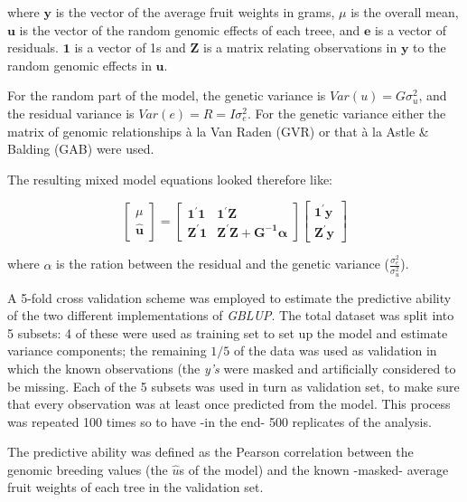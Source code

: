 \documentclass[english,11pt,a4paper]{scrartcl}
\begin{document}
where $\boldsymbol{y}$ is the vector of the average fruit weights in
grams, $\mu$ is the overall mean, $\boldsymbol{u}$ is the
vector of the random genomic effects of each treee, and $\boldsymbol{e}$ is a
vector of residuals. $\boldsymbol{1}$ is a vector of 1s and
$\boldsymbol{Z}$ is a matrix relating observations in $\boldsymbol{y}$ to
the random genomic effects in $\boldsymbol{u}$.

For the random part of the model, the genetic variance is
$Var(u)=G\sigma^2_u$, and the residual variance is
$Var(e)=R=I\sigma^2_e$.
For the genetic variance either the matrix of genomic relationships
\`{a} la Van Raden (GVR) or that \`{a} la Astle \& Balding (GAB) were used. 

The resulting mixed model equations looked therefore like:

\begin{equation}
\begin{bmatrix}
\mu \\
\boldsymbol{\hat{u}}
\end{bmatrix}
=
\begin{bmatrix}
\boldsymbol{1^\prime}\boldsymbol{1} & \boldsymbol{1^\prime}\boldsymbol{Z} \\
\boldsymbol{Z^\prime}\boldsymbol{1} & \boldsymbol{Z^\prime}\boldsymbol{Z}+\boldsymbol{G^{-1}\alpha}
\end{bmatrix}
\begin{bmatrix}
\boldsymbol{1^\prime}\boldsymbol{y} \\
\boldsymbol{Z^\prime}\boldsymbol{y}
\end{bmatrix}
\end{equation}

where $\alpha$ is the ration between the residual and the genetic
variance ($\frac{\sigma^2_e}{\sigma^2_u}$).

A 5-fold cross validation scheme was employed to estimate the predictive
ability of the two different implementations of \emph{GBLUP}. The total
dataset was split into 5 subsets: 4 of these were used as training set
to set up the model and estimate variance components; the remaining $1/5$ of the data was
used as validation in which the known observations (the \emph{y's} were
masked and artificially considered to be missing. Each of the 5 subsets
was used in turn as validation set, to make sure that every observation
was at least once predicted from the model.
This process was repeated 100 times so to have -in the end- 500
replicates of the analysis.
 
The predictive ability was defined as the Pearson correlation between
the genomic breeding values (the $\hat{u}$s of
the model) and the known -masked- average fruit weights of each
tree in the validation set.
\end{document}
